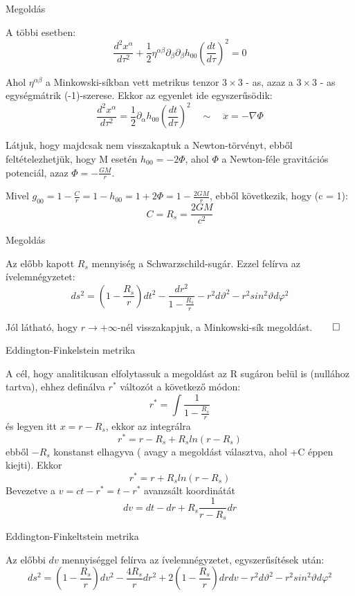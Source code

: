 \documentclass[10pt]{beamer}
\begin{document}
\begin{frame}[t]{Megoldás}
\par A többi esetben:
\begin{equation*}
\frac{d^{2}x^{\alpha}}{d\tau^{2}} + \frac{1}{2}\eta^{\alpha\beta}\partial_{\beta}\partial_{\beta}h_{00}(\frac{dt}{d\tau})^{2} = 0 
\end{equation*}
\par Ahol $\eta^{\alpha\beta}$ a Minkowski-síkban vett metrikus tenzor $3\times 3$ - as, azaz a $3 \times 3$ - as egységmátrik (-1)-szerese.
Ekkor az egyenlet ide egyszerűsödik:
\begin{equation*}
\frac{d^{2}x^{\alpha}}{d\tau^{2}} = \frac{1}{2}\partial_{\alpha}h_{00}(\frac{dt}{d\tau})^{2} \quad \sim \quad \ddot{x} = -\nabla \Phi
\end{equation*}
\par Látjuk, hogy majdcsak nem visszakaptuk a Newton-törvényt, ebből feltételezhetjük, hogy M esetén $h_{00} = -2\Phi$, ahol $\Phi$ a
Newton-féle gravitációs potenciál, azaz $\Phi = -\frac{GM}{r}$.
\vfill
\par Mivel $g_{00} = 1 - \frac{C}{r} = 1 - h_{00} = 1 + 2\Phi = 1 - \frac{2GM}{r}$, ebből következik, hogy (c = 1):
\begin{equation*}
C = R_{s} = \frac{2GM}{c^{2}}
\end{equation*} 
\end{frame}

\begin{frame}[t]{Megoldás}
\par Az előbb kapott $R_{s}$ mennyiség a Schwarzschild-sugár. Ezzel felírva az ívelemnégyzetet:
\begin{equation*}
ds^{2} = (1-\frac{R_{s}}{r})dt^{2} - \frac{dr^{2}}{1-\frac{R_{s}}{r}} - r^{2}d\vartheta^{2} - r^{2}sin^{2}\vartheta d\varphi^{2}
\end{equation*}
\par Jól látható, hogy $r \rightarrow +\infty$-nél visszakapjuk, a Minkowski-sík megoldást.$\qed$
\end{frame}

\begin{frame}[t]{Eddington-Finkelstein metrika}
\par A cél, hogy analitikusan elfolytassuk a megoldást az R sugáron belül is (nullához tartva), ehhez definálva $r^{*}$ változót a következő módon:
$$r^{*}= \int \frac{1}{1 - \frac{R_{s}}{r}}$$
és legyen itt $x = r-R_{s}$, ekkor az integrálra $$r^{*} = r - R_{s} + R_{s}ln(r - R_{s})$$ 
ebből $-R_{s}$ konstanst elhagyva ( avagy a megoldást választva, ahol +C éppen kiejti). Ekkor $$ r^{*} = r + R_{s}ln(r - R_{s})$$
Bevezetve a $v = ct - r^{*} = t - r^{*}$ avanzsált koordinátát $$dv = dt - dr + R_{s}\frac{1}{r- R_{s}}dr$$
\end{frame}

\begin{frame}[t]{Eddington-Finkeltstein metrika}
\par Az előbbi $dv$ mennyiséggel felírva az ívelemnégyzetet, egyszerűsítések után:
$$ds^{2} = (1-\frac{R_{s}}{r})dv^{2} - \frac{4R_{s}}{r}dr^{2} + 2(1-\frac{R_{s}}{r})drdv - r^{2}d\vartheta^{2} - r^{2}sin^{2}\vartheta d\varphi^{2}$$
\end{frame}
\end{document}
